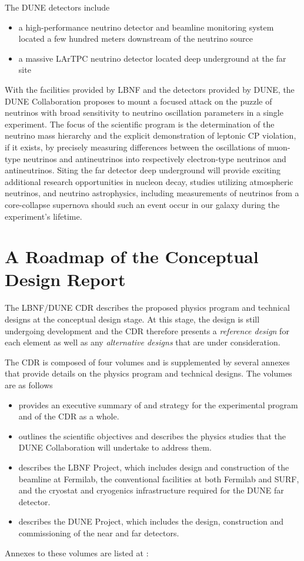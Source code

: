 The DUNE detectors include
\begin{itemize}
\item a high-performance neutrino detector and beamline monitoring system
located a few hundred meters downstream of the neutrino source
\item a massive LArTPC neutrino detector located deep underground at the far site
\end{itemize}

With the facilities provided by LBNF and the detectors
provided by DUNE, the DUNE Collaboration proposes to mount a focused
attack on the puzzle of neutrinos with broad sensitivity to neutrino
oscillation parameters in a single experiment.  The focus of the scientific program is the determination of the neutrino mass hierarchy and the explicit demonstration of leptonic CP violation, if it exists, by precisely measuring differences between the oscillations of muon-type neutrinos and antineutrinos into respectively electron-type neutrinos and antineutrinos. Siting the far detector deep underground will provide exciting additional research opportunities in nucleon decay, studies utilizing atmospheric neutrinos, and neutrino astrophysics, including measurements of neutrinos from a core-collapse supernova should such an event occur in our galaxy during the experiment's lifetime.

\section{A Roadmap of the Conceptual Design Report}

The LBNF/DUNE CDR describes the proposed physics program and 
technical designs at the conceptual design stage.  At this stage, the design is
still undergoing development and the CDR therefore presents a \textit{reference design} 
for each element as well as any \textit{alternative designs} that are under consideration.

The CDR is composed of four volumes and is supplemented by several annexes that 
provide details on the physics program and technical designs. The volumes are as follows

\begin{itemize}
\item \volintro provides an executive summary of and strategy for the experimental 
program and of the CDR as a whole.
\item \volphys outlines the scientific objectives and describes the physics studies that 
the DUNE Collaboration will undertake to address them.
\item \vollbnf describes the LBNF Project, which includes design and construction of the 
beamline at Fermilab, the conventional facilities at both Fermilab and SURF, and the cryostat
 and cryogenics infrastructure required for the DUNE far detector.
\item \voldune describes the DUNE Project, which includes the design, construction and 
commissioning of the near and far detectors. 
\end{itemize}

Annexes to these volumes are listed at :

